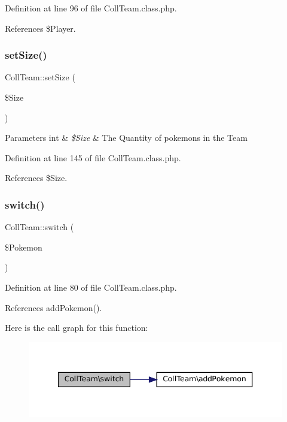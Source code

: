 Definition at line 96 of file Coll\+Team.\+class.\+php.



References \$\+Player.

\mbox{\label{class_coll_team_aa8d01c40ed16ef4aee3a6c7ccc468993}} 
\subsubsection{\texorpdfstring{set\+Size()}{setSize()}}
{\footnotesize\ttfamily Coll\+Team\+::set\+Size (\begin{DoxyParamCaption}\item[{}]{\$\+Size }\end{DoxyParamCaption})}


\begin{DoxyParams}[1]{Parameters}
int & {\em \$\+Size} & The Quantity of pokemons in the Team \\
\hline
\end{DoxyParams}


Definition at line 145 of file Coll\+Team.\+class.\+php.



References \$\+Size.

\mbox{\label{class_coll_team_aaaa6a70bcd9dc9228d30f9ea02064b50}} 
\subsubsection{\texorpdfstring{switch()}{switch()}}
{\footnotesize\ttfamily Coll\+Team\+::switch (\begin{DoxyParamCaption}\item[{}]{\$\+Pokemon }\end{DoxyParamCaption})}



Definition at line 80 of file Coll\+Team.\+class.\+php.



References add\+Pokemon().

Here is the call graph for this function\+:\nopagebreak
\begin{figure}[H]
\begin{center}
\leavevmode
\includegraphics[width=340pt]{class_coll_team_aaaa6a70bcd9dc9228d30f9ea02064b50_cgraph}
\end{center}
\end{figure}


